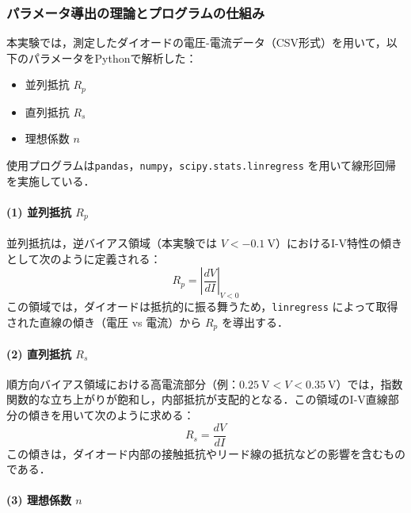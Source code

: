 \subsubsection*{パラメータ導出の理論とプログラムの仕組み}

本実験では，測定したダイオードの電圧-電流データ（CSV形式）を用いて，以下のパラメータをPythonで解析した：

\begin{itemize}
    \item 並列抵抗 \( R_p \)
    \item 直列抵抗 \( R_s \)
    \item 理想係数 \( n \)
\end{itemize}

使用プログラムは\texttt{pandas}，\texttt{numpy}，\texttt{scipy.stats.linregress} を用いて線形回帰を実施している．

\vspace{1em}
\paragraph{(1) 並列抵抗 \( R_p \)}

並列抵抗は，逆バイアス領域（本実験では \( V < -0.1~\mathrm{V} \)）におけるI-V特性の傾きとして次のように定義される：
\begin{equation}
    R_p = \left| \frac{dV}{dI} \right|_{V < 0}
\end{equation}
この領域では，ダイオードは抵抗的に振る舞うため，\texttt{linregress} によって取得された直線の傾き（電圧 vs 電流）から \( R_p \) を導出する．

\vspace{1em}
\paragraph{(2) 直列抵抗 \( R_s \)}

順方向バイアス領域における高電流部分（例：\( 0.25~\mathrm{V} < V < 0.35~\mathrm{V} \)）では，指数関数的な立ち上がりが飽和し，内部抵抗が支配的となる．この領域のI-V直線部分の傾きを用いて次のように求める：
\begin{equation}
    R_s = \frac{dV}{dI}
\end{equation}
この傾きは，ダイオード内部の接触抵抗やリード線の抵抗などの影響を含むものである．

\vspace{1em}
\paragraph{(3) 理想係数 \( n \)}

